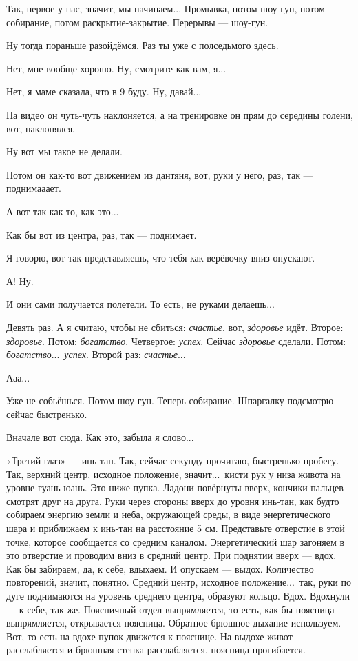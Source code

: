 \I
Так, первое у нас,
значит, мы начинаем... Промывка, потом
шоу-гун, потом собирание, потом раскрытие-закрытие. Перерывы --- шоу-гун.

\M
Ну тогда пораньше разойдёмся. Раз ты уже с полседьмого здесь.

\I
Нет, мне вообще хорошо. Ну, смотрите как вам, я...

\M
Нет, я маме сказала, что в 9 буду. Ну, давай...

\I
На видео он чуть-чуть наклоняется, а на тренировке он прям до середины голени, вот, наклонялся.

\M
Ну вот мы такое
не делали.

\I
Потом он как-то вот движением из дантяня, вот, руки у него, раз, так --- поднимааает.

\M
А вот так как-то, как это...

\I
Как бы вот из центра, раз, так --- поднимает.

\M
Я говорю, вот так представляешь, что тебя как верёвочку вниз опускают.

\I
А! Ну.

\M
И они сами получается полетели.
То есть, не руками делаешь...

\I
Девять раз. А я считаю, чтобы
не сбиться: {\it счастье}, вот, {\it здоровье\/} идёт. Второе: {\it здоровье}.
Потом: {\it богатство}. Четвертое:
{\it успех}.
Сейчас {\it здоровье\/} сделали. Потом: {\it богатство}...\
{\it успех}. Второй раз: {\it счастье}...

\M
Ааа...

\I
Уже не собьёшься.
Потом шоу-гун.
Теперь собирание. Шпаргалку подсмотрю сейчас быстренько.

\M
Вначале вот сюда. Как это, забыла я слово...

\I
«Третий глаз» --- инь-тан. Так, сейчас секунду прочитаю, быстренько пробегу.
Так, верхний центр, исходное положение, значит...\ кисти рук у низа
живота на уровне гуань-юань. Это ниже пупка.
Ладони повёрнуты вверх, кончики пальцев смотрят друг на друга.
Руки через стороны вверх до уровня инь-тан, как будто собираем энергию земли и неба,
окружающей среды, в виде энергетического шара и приближаем к инь-тан на расстояние 5 см.
Представьте отверстие в
этой точке, которое сообщается со средним каналом.
Энергетический шар загоняем в это отверстие и проводим вниз в средний центр.
При поднятии вверх --- вдох.
Как бы забираем, да, к себе, вдыхаем. И опускаем --- выдох.
Количество повторений, значит, понятно.
Средний центр, исходное положение...\ так, руки по дуге поднимаются на уровень среднего центра,
образуют кольцо. Вдох. Вдохнули --- к себе, так же.
Поясничный отдел выпрямляется, то есть, как бы поясница выпрямляется, открывается поясница.
Обратное брюшное дыхание используем.
Вот, то есть на вдохе пупок движется к пояснице.
На выдохе живот расслабляется
и брюшная стенка
расслабляется, поясница прогибается.

